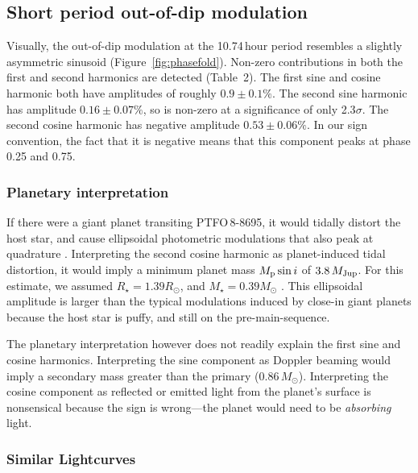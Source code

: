 \documentclass[12pt,twocolumn,tighten]{aastex62}
\newcommand{\ptfo}{PTFO$\,$8-8695}
\begin{document}
\subsection{Short period out-of-dip modulation}

Visually, the out-of-dip modulation at the 10.74$\,$hour period
resembles a slightly asymmetric sinusoid (Figure~\ref{fig:phasefold}).
Non-zero contributions in both the first and second harmonics are
detected (Table~2).  The first sine and cosine harmonic both have
amplitudes of roughly $0.9\pm0.1\%$.  The second sine harmonic has
amplitude $0.16 \pm 0.07\%$, so is non-zero at a significance of only
2.3$\sigma$.  The second cosine harmonic has negative amplitude $0.53
\pm 0.06\%$.  In our sign convention, the fact that it is negative
means that this component peaks at phase 0.25 and 0.75.

\subsubsection{Planetary interpretation}
If there were a giant planet transiting \ptfo, it would tidally
distort the host star, and cause ellipsoidal photometric modulations
that also peak at quadrature \citep[see][]{shporer_astrophysics_2017}.
Interpreting the second cosine harmonic as planet-induced tidal distortion,
it would imply a minimum planet mass $M_{\rm p} \sin i$ of
$3.8\,M_{\rm Jup}$.  For this estimate, we assumed $R_\star = 1.39
R_\odot$, and $M_\star = 0.39 M_\odot$ \citep{van_eyken_ptf_2012}.
This ellipsoidal amplitude is larger than the typical
modulations induced by close-in giant planets because the host star is
puffy, and still on the pre-main-sequence.

The planetary interpretation however does not readily explain the
first sine and cosine harmonics.  Interpreting the sine component as
Doppler beaming would imply a secondary mass greater than the primary
($0.86\,M_\odot$).  Interpreting the cosine component as reflected or
emitted light from the planet's surface is nonsensical because the sign is wrong---the
planet would need to be {\it absorbing} light.

\subsubsection{Similar Lightcurves}
\end{document}
